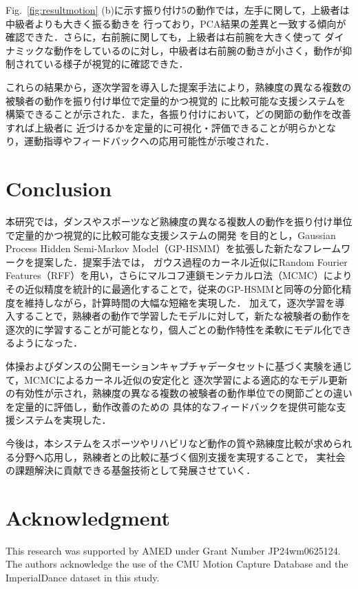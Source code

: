 \documentclass[conference]{IEEEtran}
\begin{document}
Fig.~\ref{fig:resultmotion} (b)に示す振り付け5の動作では，左手に関して，上級者は中級者よりも大きく振る動きを
行っており，PCA結果の差異と一致する傾向が確認できた．さらに，右前腕に関しても，上級者は右前腕を大きく使って
ダイナミックな動作をしているのに対し，中級者は右前腕の動きが小さく，動作が抑制されている様子が視覚的に確認できた．

これらの結果から，逐次学習を導入した提案手法により，熟練度の異なる複数の被験者の動作を振り付け単位で定量的かつ視覚的
に比較可能な支援システムを構築できることが示された．また，各振り付けにおいて，どの関節の動作を改善すれば上級者に
近づけるかを定量的に可視化・評価できることが明らかとなり，運動指導やフィードバックへの応用可能性が示唆された．

\section{Conclusion}
本研究では，ダンスやスポーツなど熟練度の異なる複数人の動作を振り付け単位で定量的かつ視覚的に比較可能な支援システムの開発
を目的とし，Gaussian Process Hidden Semi-Markov Model（GP-HSMM）を拡張した新たなフレームワークを提案した．提案手法では，
ガウス過程のカーネル近似にRandom Fourier Features（RFF）を用い，さらにマルコフ連鎖モンテカルロ法（MCMC）により
その近似精度を統計的に最適化することで，従来のGP-HSMMと同等の分節化精度を維持しながら，計算時間の大幅な短縮を実現した．
加えて，逐次学習を導入することで，熟練者の動作で学習したモデルに対して，新たな被験者の動作を
逐次的に学習することが可能となり，個人ごとの動作特性を柔軟にモデル化できるようになった．

体操およびダンスの公開モーションキャプチャデータセットに基づく実験を通じて，MCMCによるカーネル近似の安定化と
逐次学習による適応的なモデル更新の有効性が示され，熟練度の異なる複数の被験者の動作単位での関節ごとの違いを定量的に評価し，動作改善のための
具体的なフィードバックを提供可能な支援システムを実現した．

今後は，本システムをスポーツやリハビリなど動作の質や熟練度比較が求められる分野へ応用し，熟練者との比較に基づく個別支援を実現することで，
実社会の課題解決に貢献できる基盤技術として発展させていく．

\section*{Acknowledgment}
This research was supported by AMED under Grant Number JP24wm0625124.  
The authors acknowledge the use of the CMU Motion Capture Database and the ImperialDance dataset in this study.
\end{document}
